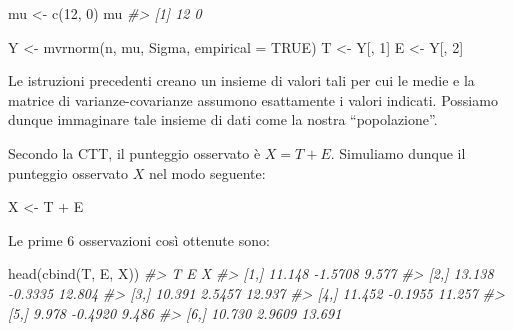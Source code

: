 \documentclass[
  11pt,
]{krantz}
\makeatletter
\newenvironment{Shaded}{\begin{snugshade}}{\end{snugshade}}
\newcommand{\AttributeTok}[1]{\textcolor[rgb]{0.61,0.61,0.61}{#1}}
\newcommand{\CommentTok}[1]{\textcolor[rgb]{0.37,0.37,0.37}{\textit{#1}}}
\newcommand{\ConstantTok}[1]{\textcolor[rgb]{0,0,0}{#1}}
\newcommand{\DecValTok}[1]{\textcolor[rgb]{0.06,0.06,0.06}{#1}}
\newcommand{\FunctionTok}[1]{\textcolor[rgb]{0,0,0}{#1}}
\newcommand{\NormalTok}[1]{#1}
\newcommand{\OtherTok}[1]{\textcolor[rgb]{0.37,0.37,0.37}{#1}}
\newcommand{\SpecialCharTok}[1]{\textcolor[rgb]{0,0,0}{#1}}
\newenvironment{kframe}{%
\medskip{}
\setlength{\fboxsep}{.8em}
 \def\at@end@of@kframe{}%
 \ifinner\ifhmode%
  \def\at@end@of@kframe{\end{minipage}}%
  \begin{minipage}{\columnwidth}%
 \fi\fi%
 \def\FrameCommand##1{\hskip\@totalleftmargin \hskip-\fboxsep
 \colorbox{shadecolor}{##1}\hskip-\fboxsep
     \hskip-\linewidth \hskip-\@totalleftmargin \hskip\columnwidth}%
 \MakeFramed {\advance\hsize-\width
   \@totalleftmargin\z@ \linewidth\hsize
   \@setminipage}}%
 {\par\unskip\endMakeFramed%
 \at@end@of@kframe}
\renewenvironment{Shaded}{\begin{kframe}}{\end{kframe}}
\theoremstyle{definition}
\theoremstyle{definition}
\theoremstyle{definition}
\theoremstyle{definition}
\theoremstyle{remark}
\makeatother
\begin{document}
\begin{Shaded}
\begin{Highlighting}[]
\NormalTok{mu }\OtherTok{\textless{}{-}} \FunctionTok{c}\NormalTok{(}\DecValTok{12}\NormalTok{, }\DecValTok{0}\NormalTok{)}
\NormalTok{mu}
\CommentTok{\#\textgreater{} [1] 12  0}
\end{Highlighting}
\end{Shaded}

\begin{Shaded}
\begin{Highlighting}[]
\NormalTok{Y }\OtherTok{\textless{}{-}} \FunctionTok{mvrnorm}\NormalTok{(n, mu, Sigma, }\AttributeTok{empirical =} \ConstantTok{TRUE}\NormalTok{)}
\NormalTok{T }\OtherTok{\textless{}{-}}\NormalTok{ Y[, }\DecValTok{1}\NormalTok{]}
\NormalTok{E }\OtherTok{\textless{}{-}}\NormalTok{ Y[, }\DecValTok{2}\NormalTok{]}
\end{Highlighting}
\end{Shaded}

Le istruzioni precedenti creano un insieme di valori tali per cui le medie e la matrice di varianze-covarianze assumono esattamente i valori indicati. Possiamo dunque immaginare tale insieme di dati come la nostra ``popolazione''.

Secondo la CTT, il punteggio osservato è \(X = T + E\). Simuliamo dunque il punteggio osservato \(X\) nel modo seguente:

\begin{Shaded}
\begin{Highlighting}[]
\NormalTok{X }\OtherTok{\textless{}{-}}\NormalTok{ T }\SpecialCharTok{+}\NormalTok{ E}
\end{Highlighting}
\end{Shaded}

Le prime 6 osservazioni così ottenute sono:

\begin{Shaded}
\begin{Highlighting}[]
\FunctionTok{head}\NormalTok{(}\FunctionTok{cbind}\NormalTok{(T, E, X))}
\CommentTok{\#\textgreater{}           T       E      X}
\CommentTok{\#\textgreater{} [1,] 11.148 {-}1.5708  9.577}
\CommentTok{\#\textgreater{} [2,] 13.138 {-}0.3335 12.804}
\CommentTok{\#\textgreater{} [3,] 10.391  2.5457 12.937}
\CommentTok{\#\textgreater{} [4,] 11.452 {-}0.1955 11.257}
\CommentTok{\#\textgreater{} [5,]  9.978 {-}0.4920  9.486}
\CommentTok{\#\textgreater{} [6,] 10.730  2.9609 13.691}
\end{Highlighting}
\end{Shaded}
\end{document}

